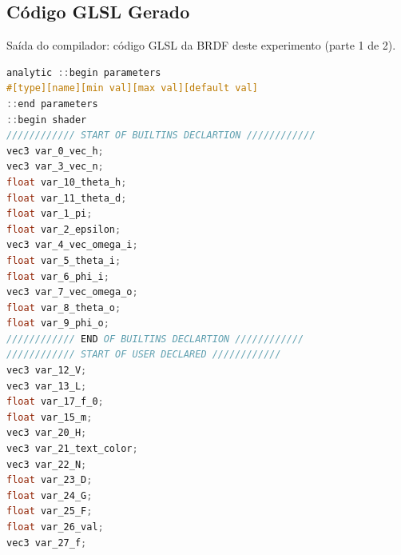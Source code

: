 \subsection{Código GLSL Gerado}
\begin{codigo}[H]
    \caption{\small Saída do compilador: código GLSL da BRDF deste experimento (parte 1 de 2).}
    \label{cod-cook-torrance-alternative-glsl-pt-1}
\begin{lstlisting}[language=C, inputencoding=utf8]
analytic ::begin parameters
#[type][name][min val][max val][default val]
::end parameters
::begin shader
//////////// START OF BUILTINS DECLARTION ////////////
vec3 var_0_vec_h;
vec3 var_3_vec_n;
float var_10_theta_h;
float var_11_theta_d;
float var_1_pi;
float var_2_epsilon;
vec3 var_4_vec_omega_i;
float var_5_theta_i;
float var_6_phi_i;
vec3 var_7_vec_omega_o;
float var_8_theta_o;
float var_9_phi_o;
//////////// END OF BUILTINS DECLARTION ////////////
//////////// START OF USER DECLARED ////////////
vec3 var_12_V;
vec3 var_13_L;
float var_17_f_0;
float var_15_m;
vec3 var_20_H;
vec3 var_21_text_color;
vec3 var_22_N;
float var_23_D;
float var_24_G;
float var_25_F;
float var_26_val;
vec3 var_27_f;
\end{lstlisting}
\end{codigo}

